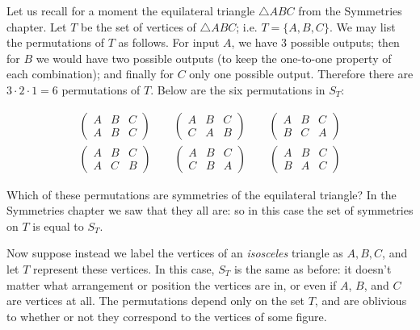 \begin{example}{}
Let us recall for a moment the equilateral triangle $\bigtriangleup ABC$ from the Symmetries chapter.  
Let $T$ be the set of vertices of $\bigtriangleup ABC$; i.e. $T = \{ A, B, C \}$.  We may list the permutations of $T$ as follows.  For input $A$, we have 3 possible outputs; then for $B$ we would have two possible outputs (to keep the one-to-one property of each combination); and finally for $C$ only one possible output.  Therefore there are $3 \cdot 2 \cdot 1 = 6$ permutations of $T$.  Below are the six permutations in  $S_T$:
 
\begin{gather*}
\begin{pmatrix}
A & B & C \\
A & B & C
\end{pmatrix}
\qquad
\begin{pmatrix}
A & B & C \\
C & A & B
\end{pmatrix}
\qquad
\begin{pmatrix}
A & B & C \\
B & C & A
\end{pmatrix}
\\
\begin{pmatrix}
A & B & C \\
A & C & B
\end{pmatrix}
\qquad
\begin{pmatrix}
A & B & C \\
C & B & A
\end{pmatrix}
\qquad
\begin{pmatrix}
A & B & C \\
B & A & C
\end{pmatrix}
\end{gather*}
\end{example}

\noindent
Which of these permutations are symmetries of the equilateral triangle?  
In the Symmetries chapter we saw that they all are: so in this case the set of symmetries on $T$ is equal to $S_T$.

Now suppose instead we label the vertices of an \emph{isosceles} triangle as $A, B, C$, and let $T$ represent these vertices.  In this case,  $S_T$  is the same as before: it doesn't matter what arrangement or position the vertices are in, or even if $A$, $B$, and $C$ are vertices at all.  The permutations depend only on the set $T$, and are oblivious to whether or not they correspond to the vertices of some figure.
 
